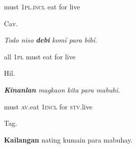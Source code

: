 \begin{stylelsIMT}
must 1\textsc{pl.incl} eat for live
\end{stylelsIMT}

\begin{listWWNumiileveli}
\item 
\begin{listWWNumiilevelii}
\item 
\begin{stylelsLanginfo}
Cav.
\end{stylelsLanginfo}
\end{listWWNumiilevelii}
\end{listWWNumiileveli}
\begin{stylelsIMT}
\textit{Todo niso }\textbf{\textit{debi}}\textit{ komí para bibí.}
\end{stylelsIMT}

\begin{stylelsIMT}
all 1\textsc{pl} must eat for live
\end{stylelsIMT}

\begin{listWWNumiileveli}
\item 
\begin{listWWNumiilevelii}
\item 
\begin{stylelsLanginfo}
Hil.
\end{stylelsLanginfo}
\end{listWWNumiilevelii}
\end{listWWNumiileveli}
\begin{stylelsIMT}
\textbf{\textit{Kinanlan}}\textit{ magkaon kita para mabuhi.}
\end{stylelsIMT}

\begin{stylelsIMT}
must \textsc{av}.eat 1\textsc{incl} for \textsc{stv}.live
\end{stylelsIMT}

\begin{listWWNumiileveli}
\item 
\begin{listWWNumiilevelii}
\item 
\begin{stylelsLanginfo}
Tag.
\end{stylelsLanginfo}
\end{listWWNumiilevelii}
\end{listWWNumiileveli}
\begin{stylelsSourceline}
\textbf{Kailangan} nating kumain para mabuhay.
\end{stylelsSourceline}

